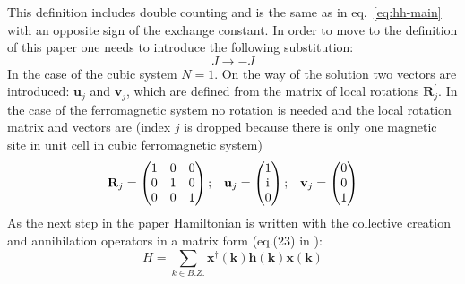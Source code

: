 \documentclass[a4paper,12pt]{article}
\newcommand{\iu}{\mathrm{i}\mkern1mu}
\begin{document}
        This definition includes double counting and is the same as in eq.~\eqref{eq:hh-main} with an opposite sign of the exchange constant. 
        In order to move to the definition of this paper one needs to introduce the following substitution:
        \begin{equation}
            J \rightarrow -J \label{eq:spinw-sub}
        \end{equation}
        In the case of the cubic system $N = 1$. 
        On the way of the solution two vectors are introduced: $\mathbf{u}_j$ and $\mathbf{v}_j$,
        which are defined from the matrix of local rotations $\mathbf{R}^{\prime}_j$. 
        In the case of the ferromagnetic system no rotation is needed and the local rotation matrix and vectors are 
        (index $j$ is dropped because there is only one magnetic site in unit cell in cubic ferromagnetic system)
        \begin{equation}
            \begin{matrix}
                \mathbf{R}_j = 
                \begin{pmatrix}
                    1 & 0 & 0 \\
                    0 & 1 & 0 \\
                    0 & 0 & 1 \\
                \end{pmatrix}; &
                \mathbf{u}_j = 
                \begin{pmatrix}
                    1 \\
                    \iu \\
                    0 \\
                \end{pmatrix}; &
                \mathbf{v}_j = 
                \begin{pmatrix}
                    0 \\
                    0 \\
                    1 \\
                \end{pmatrix}
            \end{matrix}
        \end{equation}
        As the next step in the paper Hamiltonian is written with the collective creation and annihilation operators in a matrix form (eq.(23) in \cite{toth2015linear}):
        \begin{equation}
            H = \sum_{k \in B.Z.}\mathbf{x}^{\dag}(\mathbf{k})\mathbf{h}(\mathbf{k})\mathbf{x}(\mathbf{k})
        \end{equation}
\end{document}
